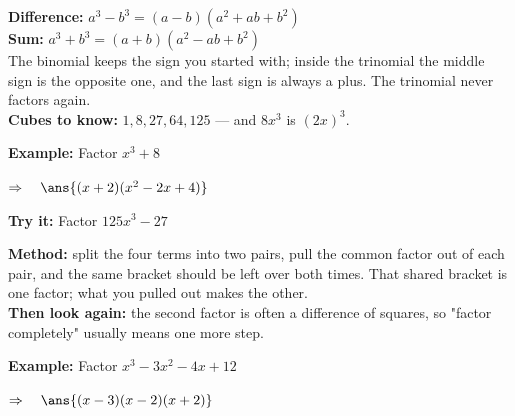 \documentclass[12pt]{article}
\begin{document}


\begin{formulabox}
\textbf{Difference:} $a^{3} - b^{3} = (a - b)(a^{2} + ab + b^{2})$\\[3pt]
\textbf{Sum:} $a^{3} + b^{3} = (a + b)(a^{2} - ab + b^{2})$\\[3pt]
The binomial keeps the sign you started with; inside the trinomial the middle
sign is the opposite one, and the last sign is always a plus. The trinomial
never factors again.\\[3pt]
\textbf{Cubes to know:} $1, 8, 27, 64, 125$ --- and $8x^{3}$ is $(2x)^{3}$.
\end{formulabox}

\begin{examplebox}
\textbf{Example:} \quad Factor $x^{3} + 8$

$\Rightarrow\quad \ans{(x+2)(x^2-2x+4)}$
\end{examplebox}

\begin{tryitbox}
\textbf{Try it:} \quad Factor $125x^{3} - 27$\\[2pt]
\end{tryitbox}


\begin{formulabox}
\textbf{Method:} split the four terms into two pairs, pull the common factor out
of each pair, and the same bracket should be left over both times. That shared
bracket is one factor; what you pulled out makes the other.\\[3pt]
\textbf{Then look again:} the second factor is often a difference of squares, so
"factor completely" usually means one more step.
\end{formulabox}

\begin{examplebox}
\textbf{Example:} \quad Factor $x^{3} - 3x^{2} - 4x + 12$

$\Rightarrow\quad \ans{(x-3)(x-2)(x+2)}$
\end{examplebox}
\end{document}
